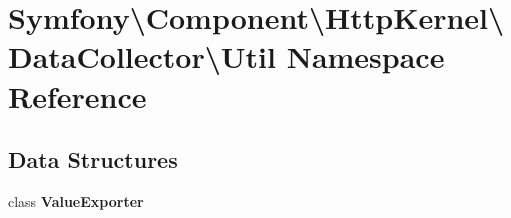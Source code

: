 \section{Symfony\textbackslash{}Component\textbackslash{}Http\+Kernel\textbackslash{}Data\+Collector\textbackslash{}Util Namespace Reference}
\label{namespace_symfony_1_1_component_1_1_http_kernel_1_1_data_collector_1_1_util}
\subsection*{Data Structures}
\begin{DoxyCompactItemize}
\item 
class {\bf Value\+Exporter}
\end{DoxyCompactItemize}
